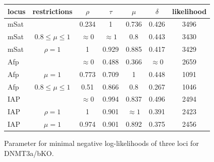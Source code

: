 \begin{figure}[h]
\begin{center}
\begin{tabularx}{\textwidth}{l|c|c|c|c|c|c}
locus&	restrictions&	$\rho$&	$\tau$&	$\mu$&	$\delta$&	likelihood\\
\hline
mSat&	&	0.234&	1&	0.736&	0.426&	3496\\%
mSat&	$0.8 \leq \mu \leq 1$&	$\approx 0$&	$\approx 1$&	0.8&	0.443&	3430\\%
mSat&	$\rho=1$&	1&	0.929&	0.885&	0.417&	3429\\%
Afp&	&	$\approx 0$&	0.488&	0.366&	$\approx 0$&	2659\\%
Afp&	$\mu=1$&	0.773&	0.709&	1&	0.448&	1091\\%
Afp&	$0.8 \leq \mu \leq 1$& 0.51&	0.866&	0.8&	0.267&	1046\\
IAP&	&	$\approx 0$&	0.994&	0.837&	0.496&	2494\\%
IAP&	$\rho=1$&	1&	0.901&	$\approx1$&	0.391&	2423\\%
IAP&	$\mu=1$&	0.974&	0.901&	0.892&	0.375&	2456\\%
\end{tabularx}
\end{center}
\label{DNMT3KO}
\caption{Parameter for minimal negative log-likelihoods of three loci for DNMT3a/bKO.}
\end{figure}

